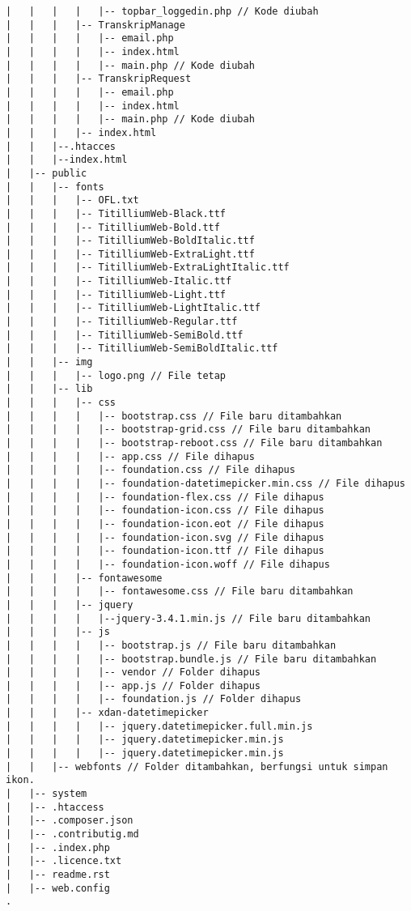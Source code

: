 \begin{lstlisting}[basicstyle=\ttfamily, frame=single, caption=Perubahan isi folder BlueTape,
columns=fullflexible, keepspaces=true, breaklines=true, label=ls:8]
|   |   |   |   |-- topbar_loggedin.php // Kode diubah
|   |   |   |-- TranskripManage
|   |   |   |   |-- email.php
|   |   |   |   |-- index.html
|   |   |   |   |-- main.php // Kode diubah
|   |   |   |-- TranskripRequest
|   |   |   |   |-- email.php
|   |   |   |   |-- index.html
|   |   |   |   |-- main.php // Kode diubah
|   |   |   |-- index.html
|   |   |--.htacces
|   |   |--index.html
|   |-- public
|   |   |-- fonts
|   |   |   |-- OFL.txt
|   |   |   |-- TitilliumWeb-Black.ttf
|   |   |   |-- TitilliumWeb-Bold.ttf
|   |   |   |-- TitilliumWeb-BoldItalic.ttf
|   |   |   |-- TitilliumWeb-ExtraLight.ttf
|   |   |   |-- TitilliumWeb-ExtraLightItalic.ttf
|   |   |   |-- TitilliumWeb-Italic.ttf
|   |   |   |-- TitilliumWeb-Light.ttf
|   |   |   |-- TitilliumWeb-LightItalic.ttf
|   |   |   |-- TitilliumWeb-Regular.ttf
|   |   |   |-- TitilliumWeb-SemiBold.ttf
|   |   |   |-- TitilliumWeb-SemiBoldItalic.ttf
|   |   |-- img
|   |   |   |-- logo.png // File tetap
|   |   |-- lib 
|   |   |   |-- css
|   |   |   |   |-- bootstrap.css // File baru ditambahkan
|   |   |   |   |-- bootstrap-grid.css // File baru ditambahkan
|   |   |   |   |-- bootstrap-reboot.css // File baru ditambahkan
|   |   |   |   |-- app.css // File dihapus
|   |   |   |   |-- foundation.css // File dihapus
|   |   |   |   |-- foundation-datetimepicker.min.css // File dihapus
|   |   |   |   |-- foundation-flex.css // File dihapus
|   |   |   |   |-- foundation-icon.css // File dihapus
|   |   |   |   |-- foundation-icon.eot // File dihapus
|   |   |   |   |-- foundation-icon.svg // File dihapus
|   |   |   |   |-- foundation-icon.ttf // File dihapus
|   |   |   |   |-- foundation-icon.woff // File dihapus
|   |   |   |-- fontawesome
|   |   |   |   |-- fontawesome.css // File baru ditambahkan
|   |   |   |-- jquery
|   |   |   |   |--jquery-3.4.1.min.js // File baru ditambahkan
|   |   |   |-- js
|   |   |   |   |-- bootstrap.js // File baru ditambahkan
|   |   |   |   |-- bootstrap.bundle.js // File baru ditambahkan
|   |   |   |   |-- vendor // Folder dihapus
|   |   |   |   |-- app.js // Folder dihapus
|   |   |   |   |-- foundation.js // Folder dihapus
|   |   |   |-- xdan-datetimepicker 
|   |   |   |   |-- jquery.datetimepicker.full.min.js
|   |   |   |   |-- jquery.datetimepicker.min.js
|   |   |   |   |-- jquery.datetimepicker.min.js
|   |   |-- webfonts // Folder ditambahkan, berfungsi untuk simpan ikon.
|   |-- system
|   |-- .htaccess
|   |-- .composer.json
|   |-- .contributig.md
|   |-- .index.php
|   |-- .licence.txt
|   |-- readme.rst
|   |-- web.config
.
\end{lstlisting}


